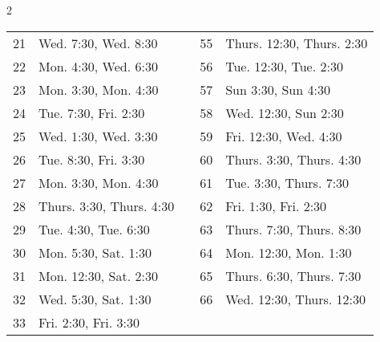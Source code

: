 \documentclass{article}
\begin{document}
\begin{multicols}{2}
\begin{table*}[ht]
\begin{tabular}{ r | l c r | l }
21 & Wed. 7:30, Wed. 8:30 & & 55 & Thurs. 12:30, Thurs. 2:30  \\
22 & Mon. 4:30, Wed. 6:30 & & 56 & Tue. 12:30, Tue. 2:30  \\
23 & Mon. 3:30, Mon. 4:30 & & 57 & Sun 3:30, Sun 4:30  \\
24 & Tue. 7:30, Fri. 2:30 & & 58 & Wed. 12:30, Sun 2:30  \\
25 & Wed. 1:30, Wed. 3:30 & & 59 & Fri. 12:30, Wed. 4:30  \\
26 & Tue. 8:30, Fri. 3:30 & & 60 & Thurs. 3:30, Thurs. 4:30  \\
27 & Mon. 3:30, Mon. 4:30 & & 61 & Tue. 3:30, Thurs. 7:30  \\
28 & Thurs. 3:30, Thurs. 4:30 & & 62 & Fri. 1:30, Fri. 2:30  \\
29 & Tue. 4:30, Tue. 6:30 & & 63 & Thurs. 7:30, Thurs. 8:30  \\
30 & Mon. 5:30, Sat. 1:30 & & 64 & Mon. 12:30, Mon. 1:30  \\
31 & Mon. 12:30, Sat. 2:30 & & 65 & Thurs. 6:30, Thurs. 7:30  \\
32 & Wed. 5:30, Sat. 1:30 & & 66 & Wed. 12:30, Thurs. 12:30  \\
33 & Fri. 2:30, Fri. 3:30 \\
   \end{tabular}
   \\[10pt]
   \caption{\small{ Another view of the schedule in Table 2, this time showing the time slots scheduled to each TA. }}
\end{table*}


\end{multicols}
\end{document}
